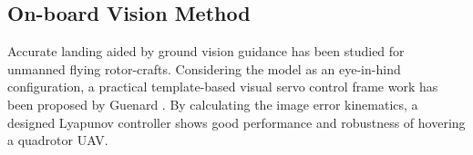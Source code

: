%
%

\subsection{On-board Vision Method}
Accurate landing aided by ground vision guidance has been studied for unmanned flying rotor-crafts.
Considering the model as an eye-in-hind configuration, a practical template-based visual servo control frame work has been proposed by Guenard \cite{Guenard2008}. By calculating the image error kinematics, a designed Lyapunov controller shows good performance and robustness of hovering a quadrotor UAV. 


